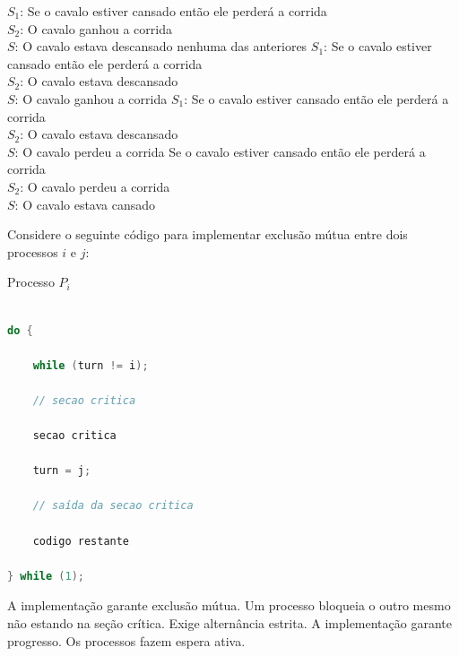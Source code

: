 \documentclass[12pt, addpoints]{exam}
\begin{document}
\begin{questions}
\begin{choices}
\choice \( S_1 \): Se o cavalo estiver cansado então ele perderá a corrida \\

              \( S_2 \): O cavalo ganhou a corrida \\

              \( S \): O cavalo estava descansado
\choice nenhuma das anteriores
\choice \( S_1 \): Se o cavalo estiver cansado então ele perderá a corrida \\

              \( S_2 \): O cavalo estava descansado \\

              \( S \): O cavalo ganhou a corrida
\choice \( S_1 \): Se o cavalo estiver cansado então ele perderá a corrida \\

              \( S_2 \): O cavalo estava descansado \\

              \( S \): O cavalo perdeu a corrida
\choice Se o cavalo estiver cansado então ele perderá a corrida \\

              \( S_2 \): O cavalo perdeu a corrida \\

              \( S \): O cavalo estava cansado
\end{choices}

\question

Considere o seguinte código para implementar exclusão mútua entre dois processos \(i\) e \(j\): 

Processo \(P_i\)

\begin{lstlisting}[language=C, basicstyle=\ttfamily\small]

do {

    while (turn != i); 

    // secao critica

    secao critica

    turn = j;

    // saída da secao critica

    codigo restante

} while (1);

\end{lstlisting} 
\begin{choices}
\choice A implementação garante exclusão mútua.
\choice Um processo bloqueia o outro mesmo não estando na seção crítica.
\choice Exige alternância estrita. 
\choice A implementação garante progresso. 
\choice Os processos fazem espera ativa.
\end{choices}


\end{questions}
\end{document}
